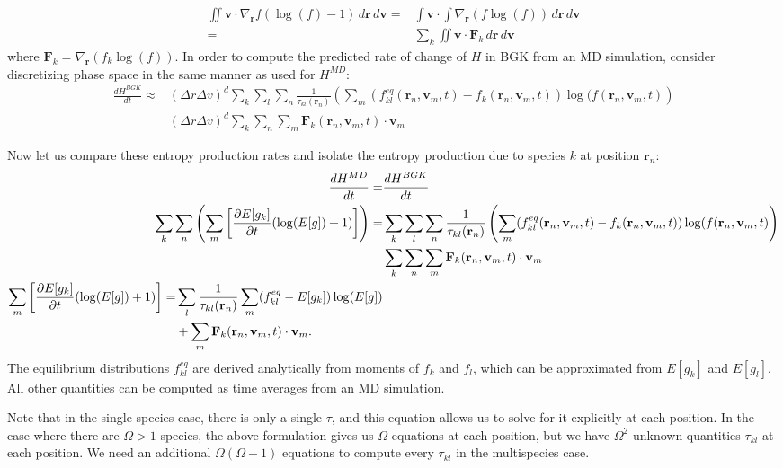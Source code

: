 \documentclass{article}
\begin{document}
\begin{align*}
\iint\mathbf{v}\cdot\nabla_\mathbf{r}f(\log(f)-1)\,d\mathbf{r}\,d\mathbf{v}=&\int \mathbf{v}\cdot\int \nabla_\mathbf{r}(f\log(f))\,d\mathbf{r}\,d\mathbf{v}\\
=&\sum_k\iint \mathbf{v}\cdot \mathbf{F}_k\,d\mathbf{r}\,d\mathbf{v}
\end{align*}
where $\mathbf{F}_k = \nabla_\mathbf{r}(f_k\log(f))$. In order to compute the predicted rate of change of $H$ in BGK from an MD simulation, consider discretizing phase space in the same manner as used for $H^{MD}$:
\begin{align*}
\frac{dH^{BGK}}{dt}\approx&(\Delta r\Delta v)^d\sum_k\sum_l\sum_n\frac{1}{\tau_{kl}(\mathbf{r}_n)}\left(\sum_m (f_{kl}^{eq}(\mathbf{r}_n,\mathbf{v}_m,t)-f_k(\mathbf{r}_n,\mathbf{v}_m,t))\log(f(\mathbf{r}_n,\mathbf{v}_m,t)\right)\\&(\Delta r\Delta v)^d\sum_k\sum_n\sum_m \mathbf{F}_k(\mathbf{r}_n,\mathbf{v}_m,t)\cdot \mathbf{v}_m
\end{align*}

Now let us compare these entropy production rates and isolate the entropy production due to species $k$ at position $\mathbf{r}_n$:
\begin{align}
\frac{d H^{MD}}{dt}=&\frac{d H^{BGK}}{dt}\notag\\
\sum_k\sum_n\left(\sum_m\left[\frac{\partial E[g_k]}{\partial t}(\log(E[g])+1)\right]\right)=&\sum_k\sum_l\sum_n\frac{1}{\tau_{kl}(\mathbf{r}_n)}\left(\sum_m (f_{kl}^{eq}(\mathbf{r}_n,\mathbf{v}_m,t)-f_k(\mathbf{r}_n,\mathbf{v}_m,t))\log(f(\mathbf{r}_n,\mathbf{v}_m,t)\right)\notag\\&\sum_k\sum_n\sum_m \mathbf{F}_k(\mathbf{r}_n,\mathbf{v}_m,t)\cdot \mathbf{v}_m\notag\\
\begin{split}\sum_m\left[\frac{\partial E[g_k]}{\partial t}(\log(E[g])+1)\right]=&\sum_l\frac{1}{\tau_{kl}(\mathbf{r}_n)}\sum_m(f_{kl}^{eq}-E[g_k])\log(E[g])\\
&+ \sum_m\mathbf{F}_k(\mathbf{r}_n,\mathbf{v}_m,t)\cdot \mathbf{v}_m.\label{eq:dHdt}
\end{split}
\end{align}
The equilibrium distributions $f_{kl}^{eq}$ are derived analytically from moments of $f_k$ and $f_l$, which can be approximated from $E[g_k]$ and $E[g_l]$. All other quantities can be computed as time averages from an MD simulation.

Note that in the single species case, there is only a single $\tau$, and this equation allows us to solve for it explicitly at each position. In the case where there are $\Omega>1$ species, the above formulation gives us $\Omega$ equations at each position, but we have $\Omega^2$ unknown quantities $\tau_{kl}$ at each position. We need an additional $\Omega(\Omega-1)$ equations to compute every $\tau_{kl}$ in the multispecies case.
\end{document}

